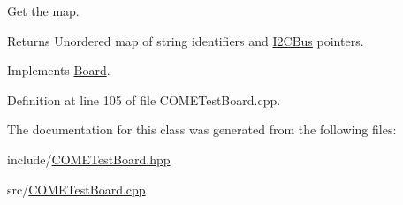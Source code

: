 Get the map. 

\begin{DoxyReturn}{Returns}
Unordered map of string identifiers and \hyperlink{class_i2_c_bus}{I2\+C\+Bus} pointers. 
\end{DoxyReturn}


Implements \hyperlink{class_board_a7579517a69f81e2fcbe9e18857a11545}{Board}.



Definition at line 105 of file C\+O\+M\+E\+Test\+Board.\+cpp.



The documentation for this class was generated from the following files\+:\begin{DoxyCompactItemize}
\item 
include/\hyperlink{_c_o_m_e_test_board_8hpp}{C\+O\+M\+E\+Test\+Board.\+hpp}\item 
src/\hyperlink{_c_o_m_e_test_board_8cpp}{C\+O\+M\+E\+Test\+Board.\+cpp}\end{DoxyCompactItemize}
